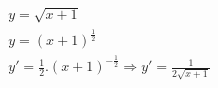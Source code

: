 \begin{ex}
\begin{align}
&y=\sqrt{x+1}\nonumber\\
&y=(x+1)^\frac{1}{2}\nonumber\\
&y'=\frac{1}{2}.(x+1)^{-\frac{1}{2}} \Rightarrow y'=\frac{1}{2\sqrt{x+1}}\nonumber
\end{align}
\end{ex}